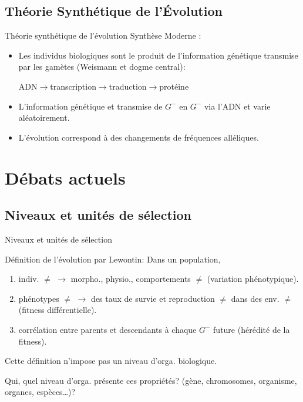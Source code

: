 \documentclass[8pt]{beamer}
\begin{document}
\subsection{Théorie Synthétique de l'\'Evolution}
\begin{frame}{Théorie synthétique de l'évolution}
	Synthèse Moderne :
	\begin{itemize}

		\item	Les individus biologiques sont le produit de l'information génétique transmise par les gamètes (Weismann et dogme central):

			\begin{center}
				ADN$\rightarrow$transcription$\rightarrow$traduction$\rightarrow$protéine
			\end{center}

		\item L'information génétique et transmise de $G^-$ en $G^-$ via l'ADN et varie aléatoirement.

	\item L'évolution correspond à des changements de fréquences alléliques.

	\end{itemize}

	


\end{frame}


\section{Débats actuels}
\subsection{Niveaux et unités de sélection}
\begin{frame}{Niveaux et unités de sélection}

	Définition de l'évolution par Lewontin:
	\vfill
	Dans un population,
	\begin{enumerate}
		\item indiv. $\ne$ $\rightarrow$ morpho., physio., comportements $\ne$ (\alert{variation phénotypique}).
		\item phénotypes $\ne$ $\rightarrow$ des taux de survie et reproduction $\ne$ dans des env. $\ne$ (\alert{fitness différentielle}).
		\item corrélation entre parents et descendants à chaque $G^-$ future (\alert{hérédité de la fitness}).
	\end{enumerate}
	\vfill

	Cette définition n'impose pas un niveau d'orga. biologique. 
	
	Qui, quel niveau d'orga. présente ces propriétés? (gène, chromosomes, organisme, organes, espèces\ldots)?
\end{frame}
\end{document}
